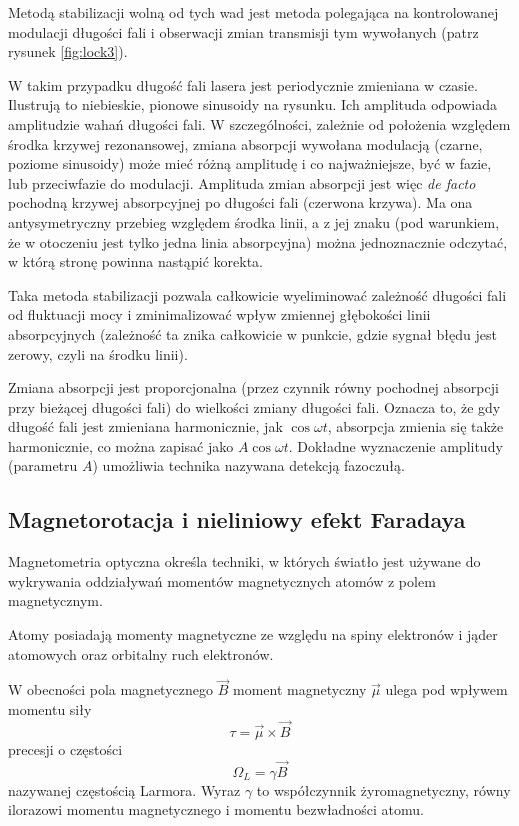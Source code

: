 \documentclass[a4paper,10pt,twoside]{article}
\begin{document}
Metodą stabilizacji wolną od tych wad jest metoda  polegająca na kontrolowanej modulacji długości fali i obserwacji zmian transmisji tym wywołanych (patrz rysunek \ref{fig:lock3}).

 W takim przypadku długość fali lasera jest periodycznie zmieniana w czasie. Ilustrują to niebieskie, pionowe sinusoidy na rysunku. Ich amplituda odpowiada amplitudzie wahań długości fali.
W szczególności, zależnie od położenia względem środka krzywej rezonansowej, zmiana absorpcji wywołana modulacją (czarne, poziome sinusoidy) może mieć
 różną amplitudę i co najważniejsze, być w fazie, lub przeciwfazie do modulacji.
  Amplituda zmian absorpcji jest więc \textit{de facto} pochodną krzywej absorpcyjnej po długości fali (czerwona krzywa). 
  Ma ona antysymetryczny przebieg względem środka linii, a z jej znaku (pod warunkiem, że w otoczeniu jest tylko jedna linia absorpcyjna)
 można jednoznacznie odczytać, w którą stronę powinna nastąpić korekta.
 
 Taka metoda stabilizacji pozwala całkowicie wyeliminować zależność długości fali od fluktuacji mocy  i zminimalizować wpływ zmiennej głębokości linii absorpcyjnych (zależność ta znika całkowicie w punkcie, gdzie sygnał błędu jest zerowy, czyli na środku linii).

Zmiana absorpcji jest proporcjonalna (przez czynnik równy pochodnej absorpcji przy bieżącej długości fali) do wielkości zmiany długości fali. Oznacza to, że gdy długość fali jest zmieniana harmonicznie, jak $\cos \omega t$, absorpcja zmienia się także harmonicznie, co można zapisać jako $A \cos \omega t$. Dokładne wyznaczenie amplitudy (parametru $A$)
umożliwia technika nazywana detekcją fazoczułą.
\label{olockinie}


\pagebreak

\subsection{Magnetorotacja i nieliniowy efekt Faradaya}

Magnetometria optyczna określa techniki, w których światło jest używane  do wykrywania oddziaływań momentów magnetycznych atomów z polem magnetycznym.

Atomy posiadają momenty magnetyczne ze względu na spiny elektronów i jąder atomowych oraz orbitalny ruch elektronów.

W obecności pola magnetycznego $\vec B$ moment magnetyczny $\vec \mu$ ulega pod wpływem momentu siły
\begin{equation}
\tau =\vec \mu \times \vec B
\end{equation}
precesji o częstości
\begin{equation}
\Omega_L =\gamma \vec B
\end{equation}
nazywanej częstością Larmora. Wyraz $\gamma$ to współczynnik żyromagnetyczny, równy ilorazowi momentu magnetycznego i momentu bezwładności atomu.
\end{document}
